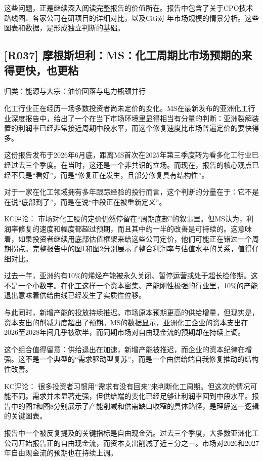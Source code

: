 \documentclass[11pt]{ctexart}
\begin{document}
这些问题，正是继续深入阅读完整报告的价值所在。报告中包含了关于CPO技术路线图、各家公司在研项目的详细对比，以及Citi对 年市场规模的情景分析。这些图表和数据，是形成独立判断的基础。

\subsection{[R037] 摩根斯坦利：MS：化工周期比市场预期的来得更快，也更粘}
{\small\color{refgray}归类：能源与大宗：油价回落与电力瓶颈并行}

化工行业正在经历一场多数投资者尚未定价的变化。MS在最新发布的亚洲化工行业深度报告中，给出了一个在当下市场环境里显得相当有分量的判断：亚洲裂解装置的利润率已经非常接近周期中段水平，而这个修复速度比市场普遍定价的要快得多。

这份报告发布于2026年6月底，距离MS首次在2025年第三季度转为看多化工行业已经过去三个季度。在当时，这还是一个非共识的立场。而现在，报告的核心观点已经不只是“看好”，而是“修复正在发生，且部分修复具有结构性”。

对于一家在化工领域拥有多年跟踪经验的投行而言，这个判断的分量在于：它不是在说“底部到了”，而是在说“中段正在被重新定义”。

KC评论： 市场对化工股的定价仍然停留在“周期底部”的叙事里。但MS认为，利润率修复的速度和幅度都超过预期，而且其中约一半的改善是可持续的。这意味着，如果投资者继续用底部估值框架来给这些公司定价，他们可能正在错过一个周期拐点。完整报告中的图1和图2分别展示了整合利润率与估值水平的关系，值得仔细对比。

过去一年，亚洲约有10\%的烯烃产能被永久关闭、暂停运营或处于超长检修期。这不是一个小数字。在化工这样一个资本密集、产能刚性极强的行业里，10\%的产能退出意味着供给曲线已经发生了实质性位移。

与此同时，新增产能的投放持续推迟。市场原本预期更高的供给增量，但现实是，资本支出的削减力度超出了预期。MS的数据显示，亚洲化工企业的资本支出在2026至2028年间几乎被砍半，而同期市场对自由现金流的预期却在持续上调。

这个组合值得留意：供给退出在加速，新增产能被推迟，而企业的资本纪律在增强。这不是一个典型的“需求驱动型复苏”，而是一个由供给端自我修复推动的结构性改善。

KC评论： 很多投资者习惯用“需求有没有回来”来判断化工周期。但这次的情况可能不同。需求并未显著走强，但供给端的变化已经足够让利润率回到中段水平。报告中的图7和图8分别展示了产能削减和供需缺口收窄的具体路径，是理解这一逻辑的关键图表。

报告中一个被反复提及的关键指标是自由现金流。过去三个季度，大多数亚洲化工公司开始报告正的自由现金流，而资本支出削减了近三分之一。市场对2026和2027年自由现金流的预期也在持续上调。
\end{document}
